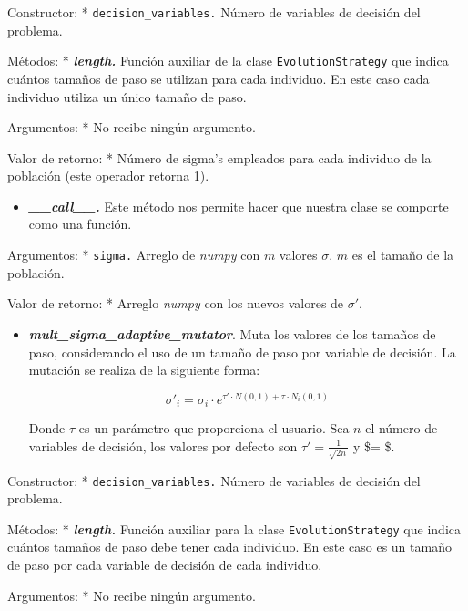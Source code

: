 \documentclass[11pt]{article}
\providecommand{\tightlist}{%
      \setlength{\itemsep}{0pt}\setlength{\parskip}{0pt}}
\begin{document}
Constructor: * \texttt{decision\_variables.} Número de variables de
decisión del problema.

Métodos: * \emph{\textbf{length.}} Función auxiliar de la clase
\texttt{EvolutionStrategy} que indica cuántos tamaños de paso se
utilizan para cada individuo. En este caso cada individuo utiliza un
único tamaño de paso.

Argumentos: * No recibe ningún argumento.

Valor de retorno: * Número de sigma's empleados para cada individuo de
la población (este operador retorna 1).

\begin{itemize}
\tightlist
\item
  \emph{\textbf{\_\_call\_\_.}} Este método nos permite hacer que
  nuestra clase se comporte como una función.
\end{itemize}

Argumentos: * \texttt{sigma.} Arreglo de \emph{numpy} con \(m\) valores
\(\sigma\). \(m\) es el tamaño de la población.

Valor de retorno: * Arreglo \emph{numpy} con los nuevos valores de
\(\sigma'\).

    \begin{itemize}
\tightlist
\item
  \emph{\textbf{mult\_sigma\_adaptive\_mutator}}. Muta los valores de
  los tamaños de paso, considerando el uso de un tamaño de paso por
  variable de decisión. La mutación se realiza de la siguiente forma:

  \begin{equation}
  \sigma'_i = \sigma_i \cdot e ^ {\tau' \cdot N(0,1) + \tau \cdot N_i(0,1)}
  \end{equation}

  Donde \(\tau\) es un parámetro que proporciona el usuario. Sea \(n\)
  el número de variables de decisión, los valores por defecto son
  \(\tau' = \frac{1}{\sqrt{2n}}\) y \$\tau = 
  \$.
\end{itemize}

Constructor: * \texttt{decision\_variables.} Número de variables de
decisión del problema.

Métodos: * \emph{\textbf{length.}} Función auxiliar para la clase
\texttt{EvolutionStrategy} que indica cuántos tamaños de paso debe tener
cada individuo. En este caso es un tamaño de paso por cada variable de
decisión de cada individuo.

Argumentos: * No recibe ningún argumento.
\end{document}
